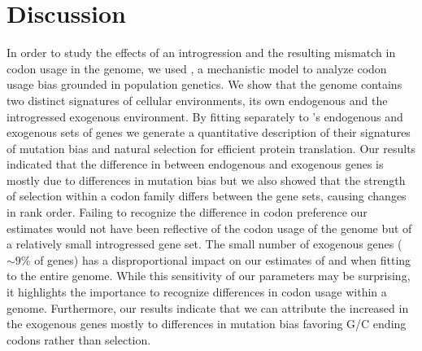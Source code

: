 \section{Discussion}

In order to study the effects of an introgression and the resulting mismatch in codon usage in the \kluyveri genome, we used \ROC \citet{gilchrist2015}, a mechanistic model to analyze codon usage bias grounded in population genetics.
We show that the \kluyveri genome contains two distinct signatures of cellular environments, its own endogenous and the introgressed exogenous environment.
By fitting \ROC separately to \kluyveri's endogenous and exogenous sets of genes we generate a quantitative description of their signatures of mutation bias and natural selection for efficient protein translation.
Our results indicated that the difference in \GC between endogenous and exogenous genes is mostly due to differences in mutation bias but we also showed that the strength of selection within a codon family differs between the gene sets, causing changes in rank order.
Failing to recognize the difference in codon preference our estimates would not have been reflective of the codon usage of the \kluyveri genome but of a relatively small introgressed gene set.
The small number of exogenous genes ($\sim 9 \%$ of genes) has a disproportional impact on our estimates of \DM and \DE when fitting \ROC to the entire \kluyveri genome.
While this sensitivity of our parameters may be surprising, it highlights the importance to recognize differences in codon usage within a genome.
Furthermore, our results indicate that we can attribute the increased \GC in the exogenous genes mostly to differences in mutation bias favoring G/C ending codons rather than selection.

